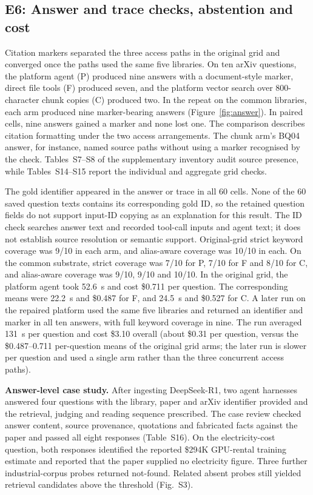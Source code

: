 \subsection{E6: Answer and trace checks, abstention and cost}
\label{sec:e5}
\label{sec:agentic}\label{sec:abstention}\label{sec:composition}\label{sec:eval-agent}
Citation markers separated the three access paths in the original grid
and converged once the paths used the same five libraries. On ten arXiv
questions, the platform agent (P) produced nine answers with a
document-style marker, direct file tools (F) produced seven, and the
platform vector search over 800-character chunk copies (C) produced two.
In the repeat on the common libraries, each arm produced nine marker-bearing
answers (Figure~\ref{fig:answer}). In paired cells, nine answers gained a
marker and none lost one. The comparison describes citation formatting
under the two access arrangements. The chunk arm's BQ04 answer, for
instance, named source paths without using a marker recognised by the
check. Tables~S7--S8 of the supplementary inventory audit source presence,
while Tables~S14--S15 report the individual and aggregate grid checks.

The gold identifier appeared in the answer or trace in all 60 cells.
None of the 60 saved question texts contains its corresponding gold ID, so
the retained question fields do not support input-ID copying as an explanation
for this result. The ID check searches answer text and recorded tool-call
inputs and agent text; it does not establish source resolution or semantic
support. Original-grid strict keyword coverage was 9/10 in each arm, and
alias-aware coverage was 10/10 in each. On the common substrate, strict
coverage was
7/10 for P, 7/10 for F and 8/10 for C, and alias-aware coverage was
9/10, 9/10 and 10/10. In the original grid, the platform agent took
52.6~s and cost \$0.711 per question. The corresponding means were 22.2~s
and \$0.487 for F, and 24.5~s and \$0.527 for C. A later run on the
repaired platform used the same five libraries and returned an identifier
and marker in all ten answers, with full keyword coverage in nine.
The run averaged 131~s per question and cost \$3.10 overall
(about \$0.31 per question, versus the \$0.487--0.711 per-question means
of the original grid arms; the later run is slower per question and used
a single arm rather than the three concurrent access paths).

\textbf{Answer-level case study.} After ingesting DeepSeek-R1, two agent
harnesses answered four questions with the library, paper and arXiv identifier
provided and the retrieval, judging and reading sequence prescribed.
The case review checked answer content, source provenance, quotations
and fabricated facts against the paper and passed all eight responses
(Table~S16). On the electricity-cost question, both responses identified
the reported \$294K GPU-rental training estimate and reported that the
paper supplied no electricity figure. Three further industrial-corpus
probes returned not-found. Related absent probes still yielded retrieval
candidates above the threshold (Fig.~S3).

